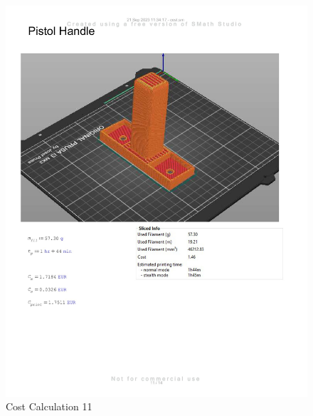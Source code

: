 \begin{figure}[H]
    \centering
    \includegraphics[width=\linewidth]{texs/appendix/data/cost1-11.jpg}
    \caption{Cost Calculation 11}
    \label{fig:cost-calculation-11}
\end{figure}

